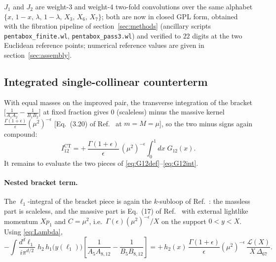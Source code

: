 \documentclass[11pt]{article}
\newcommand{\eps}{\epsilon}
\newcommand{\CT}{\mathrm{CT}}
\begin{document}
$J_1$ and $J_2$ are weight-3 and weight-4 two-fold convolutions over the same alphabet
$\{x,\,1-x,\,\lambda,\,1-\lambda,\,X_3,\,X_6,\,X_7\}$; both are now in closed GPL form, obtained
with the fibration pipeline of section~\ref{sec:methods} (ancillary scripts
\texttt{pentabox\_finite.wl}, \texttt{pentabox\_pass3.wl}) and verified to $22$ digits at the two
Euclidean reference points; numerical reference values are given in section~\ref{sec:assembly}.

\subsection{Integrated single-collinear counterterm}
\label{sec:C12int}

With equal masses on the improved pair, the transverse integration of the bracket
$\big[\tfrac{1}{A_1A_2}-\tfrac{1}{B_1B_2}\big]$ at fixed fraction gives $0$ (scaleless) minus the
massive kernel $\tfrac{\Gamma(1+\eps)}{\eps}(\mu^2)^{-\eps}$ [Eq.~(3.20) of Ref.~\cite{AS} at
$m=M=\mu$], so the two minus signs again compound:
\begin{equation}
I^{\CT}_{12}
=+\,\frac{\Gamma(1+\eps)}{\eps}\,(\mu^{2})^{-\eps}
\int_0^1 dx\;G_{12}(x) .
\label{eq:ICT12}
\end{equation}
It remains to evaluate the two pieces of \eqref{eq:G12def}--\eqref{eq:G12int}.

\paragraph{Nested bracket term.}
The $\ell_1$-integral of the bracket piece is again the $k$-subloop of Ref.~\cite{kernel}: the
massless part is scaleless, and the massive part is Eq.~(17) of Ref.~\cite{kernel} with external
lightlike momentum $Xp_1$ and $C=\mu^2$, i.e.\
$\Gamma(\eps)(\mu^2)^{-\eps}/X$ on the support $0<y<X$. Using \eqref{eq:Lambda},
\begin{equation}
-\int\frac{d^d\ell_1}{i\pi^{d/2}}\;
h_2\,h_1\big(y(\ell_1)\big)\left[\frac{1}{A_5A_{8,12}}-\frac{1}{B_5B_{8,12}}\right]
=+\,h_2(x)\,\frac{\Gamma(1+\eps)}{\eps}(\mu^{2})^{-\eps}\,
\frac{\mathcal{L}(X)}{X\,\Delta_{67}} .
\label{eq:bracketterm}
\end{equation}
\end{document}
